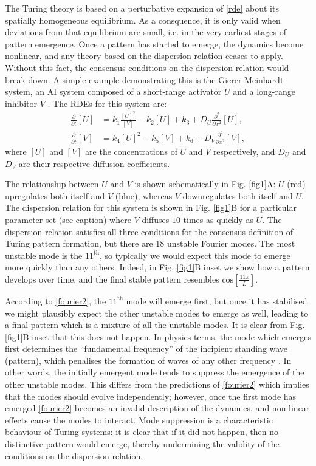 The Turing theory is based on a perturbative expansion of \eqref{rde} about its spatially homogeneous equilibrium. As a consquence, it is only valid when deviations from that equilibrium are small, i.e. in the very earliest stages of pattern emergence. Once a pattern has started to emerge, the dynamics become nonlinear, and any theory based on the dispersion relation ceases to apply. Without this fact, the consensus conditions on the dispersion relation would break down. A simple example demonstrating this is the Gierer-Meinhardt system, an AI system composed of a short-range activator $U$ and a long-range inhibitor $V$ \cite{gierer1972theory}. The RDEs for this system are:
\begin{align}\label{gierer}
\frac{\partial}{\partial t} [U]&= k_1\frac{[U]^2}{[V]}-k_2[U]+k_3+D_U\frac{\partial^2}{\partial x^2}[U],\\
\frac{\partial}{\partial t} [V]&= k_4[U]^2-k_5[V]+k_6+D_V\frac{\partial^2}{\partial x^2}[V],\nonumber
\end{align}
where $[U]$ and $[V]$ are the concentrations of $U$ and $V$ respectively, and $D_U$ and $D_V$ are their respective diffusion coefficients.

The relationship between $U$ and $V$ is shown schematically in Fig. \ref{fig1}A: $U$ (red) upregulates both itself and $V$ (blue), whereas $V$ downregulates both itself and $U$. The dispersion relation for this system is shown in Fig. \ref{fig1}B for a particular parameter set (see caption) where $V$ diffuses $10$ times as quickly as $U$. The dispersion relation satisfies all three conditions for the consensus definition of Turing pattern formation, but there are 18 unstable Fourier modes. The most unstable mode is the $11^\text{th}$, so typically we would expect this mode to emerge more quickly than any others. Indeed, in Fig. \ref{fig1}B inset we show how a pattern develops over time, and the final stable pattern resembles $\text{cos}\left[\frac{11 \pi}{L}\right]$.

According to \eqref{fourier2}, the $11^\text{th}$ mode will emerge first, but once it has stabilised we might plausibly expect the other unstable modes to emerge as well, leading to a final pattern which is a mixture of all the unstable modes. It is clear from Fig. \ref{fig1}B inset that this does not happen. In physics terms, the mode which emerges first determines the ``fundamental frequency'' of the incipient standing wave (pattern), which penalises the formation of waves of any other frequency \cite{kinsler1999fundamentals}. In other words, the initially emergent mode tends to suppress the emergence of the other unstable modes. This differs from the predictions of \eqref{fourier2} which implies that the modes should evolve independently; however, once the first mode has emerged \eqref{fourier2} becomes an invalid description of the dynamics, and non-linear effects cause the modes to interact. Mode suppression is a characteristic behaviour of Turing systems: it is clear that if it did not happen, then no distinctive pattern would emerge, thereby undermining the validity of the conditions on the dispersion relation.

